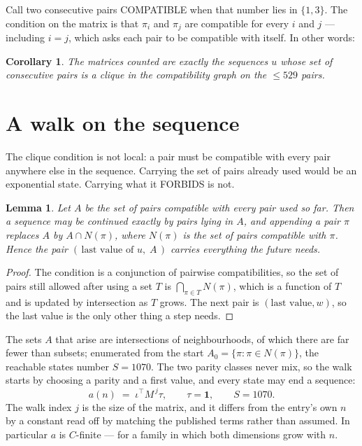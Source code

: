 \documentclass[11pt,a4paper]{article}
\theoremstyle{plain}
\newtheorem{lemma}[theorem]{Lemma}
\newtheorem{corollary}[theorem]{Corollary}
\theoremstyle{definition}
\begin{document}
Call two consecutive pairs COMPATIBLE when that number lies in $\{1,3\}$. The condition on the
matrix is that $\pi_i$ and $\pi_j$ are compatible for every $i$ and $j$ --- including $i=j$,
which asks each pair to be compatible with itself. In other words:

\begin{corollary}
The matrices counted are exactly the sequences $u$ whose set of consecutive pairs is a clique in
the compatibility graph on the $\le 529$ pairs.
\end{corollary}

\section{A walk on the sequence}

The clique condition is not local: a pair must be compatible with every pair anywhere else in
the sequence. Carrying the set of pairs already used would be an exponential state. Carrying
what it FORBIDS is not.

\begin{lemma}\label{lem:lump}
Let $A$ be the set of pairs compatible with every pair used so far. Then a sequence may be
continued exactly by pairs lying in $A$, and appending a pair $\pi$ replaces $A$ by
$A\cap N(\pi)$, where $N(\pi)$ is the set of pairs compatible with $\pi$. Hence the pair
$(\,\text{last value of }u,\;A\,)$ carries everything the future needs.
\end{lemma}

\begin{proof}
The condition is a conjunction of pairwise compatibilities, so the set of pairs still allowed
after using a set $T$ is $\bigcap_{\pi\in T}N(\pi)$, which is a function of $T$ and is updated
by intersection as $T$ grows. The next pair is $(\text{last value},w)$, so the last value is
the only other thing a step needs.
\end{proof}

The sets $A$ that arise are intersections of neighbourhoods, of which there are far fewer than
subsets; enumerated from the start $A_0=\{\pi:\pi\in N(\pi)\}$, the reachable states number
$S=1070$. The two parity classes never mix, so the walk starts by choosing a parity and a first
value, and every state may end a sequence:
\[
a(n)\;=\;\iota^{\!\top}M^{\,j}\tau ,\qquad \tau=\mathbf{1},\qquad S=1070.
\]
The walk index $j$ is the size of the matrix, and it differs from the entry's own $n$ by a
constant read off by matching the published terms rather than assumed. In particular $a$ is
$C$-finite --- for a family in which both dimensions grow with $n$.
\end{document}
